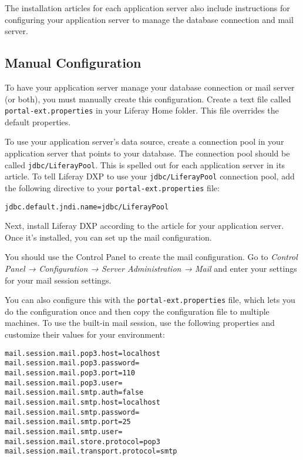 The installation articles for each application server also include
instructions for configuring your application server to manage the
database connection and mail server.

\subsection{Manual Configuration}\label{manual-configuration}

To have your application server manage your database connection or mail
server (or both), you must manually create this configuration. Create a
text file called \texttt{portal-ext.properties} in your Liferay Home
folder. This file overrides the default properties.

To use your application server's data source, create a connection pool
in your application server that points to your database. The connection
pool should be called \texttt{jdbc/LiferayPool}. This is spelled out for
each application server in its article. To tell Liferay DXP to use your
\texttt{jdbc/LiferayPool} connection pool, add the following directive
to your \texttt{portal-ext.properties} file:

\begin{verbatim}
jdbc.default.jndi.name=jdbc/LiferayPool
\end{verbatim}

Next, install Liferay DXP according to the article for your application
server. Once it's installed, you can set up the mail configuration.

You should use the Control Panel to create the mail configuration. Go to
\emph{Control Panel → Configuration → Server Administration → Mail} and
enter your settings for your mail session settings.

You can also configure this with the \texttt{portal-ext.properties}
file, which lets you do the configuration once and then copy the
configuration file to multiple machines. To use the built-in mail
session, use the following properties and customize their values for
your environment:

\begin{verbatim}
mail.session.mail.pop3.host=localhost
mail.session.mail.pop3.password=
mail.session.mail.pop3.port=110
mail.session.mail.pop3.user=
mail.session.mail.smtp.auth=false
mail.session.mail.smtp.host=localhost
mail.session.mail.smtp.password=
mail.session.mail.smtp.port=25
mail.session.mail.smtp.user=
mail.session.mail.store.protocol=pop3
mail.session.mail.transport.protocol=smtp
\end{verbatim}

